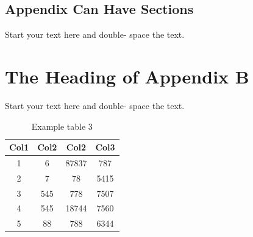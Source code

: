 \documentclass[debug, font=Times]{gw-dissertation}[2021/11/19]
\begin{document}
    \section{Appendix Can Have Sections}
    Start your text here and double- space the text.

\chapter{The Heading of Appendix B}
Start your text here and double- space the text.
\begin{table}[h!]
    \Centering
    \begin{tabular}{||c c c c||}
         \hline
         Col1 & Col2 & Col2 & Col3 \\ [0.5ex]
         \hline\hline
         1 & 6 & 87837 & 787 \\
         2 & 7 & 78 & 5415 \\
         3 & 545 & 778 & 7507 \\
         4 & 545 & 18744 & 7560 \\
         5 & 88 & 788 & 6344 \\ [1ex]
         \hline
    \end{tabular}
    \caption{Example table 3}
\end{table}
\end{document}
